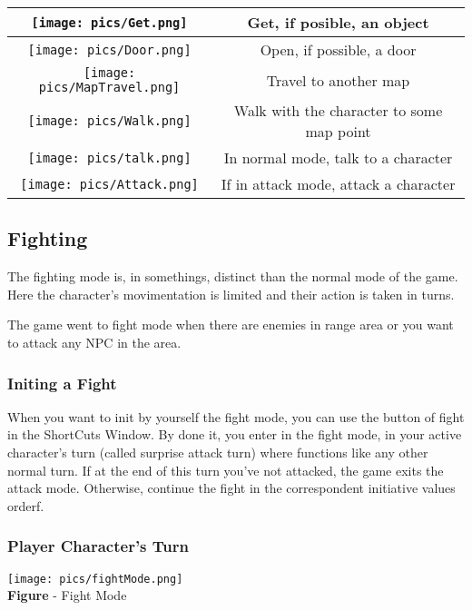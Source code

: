 \documentclass[ letterpaper,12pt]{article}
\begin{document}
\begin{tabular}{|c|c|}
\hline
 \texttt{[image: pics/Get.png]} & Get, if posible, an object\\
\hline
 \texttt{[image: pics/Door.png]} & Open, if possible, a door\\
\hline
 \texttt{[image: pics/MapTravel.png]} & Travel to another map\\
\hline
 \texttt{[image: pics/Walk.png]} & Walk with the character to some map point\\
\hline
 \texttt{[image: pics/talk.png]} & In normal mode, talk to a character\\
\hline
 \texttt{[image: pics/Attack.png]} & If in attack mode, attack a character\\
\hline
\end{tabular}

\subsection{Fighting}

The fighting mode is, in somethings, distinct than the normal mode of the game.
Here the character's movimentation is limited and their action is taken in
turns.

The game went to fight mode when there are enemies in range area or you want to attack any NPC in the area.

\subsubsection{Initing a Fight}

When you want to init by yourself the fight mode, you can use the button of fight in the ShortCuts Window. By done it, you enter in the fight mode, in your active character's turn (called surprise attack turn) where functions like any other normal turn. If at the end of this turn you've not attacked, the game exits the attack mode. Otherwise, continue the fight in the  correspondent initiative values orderf.

\subsubsection{Player Character's Turn}

\begin{center}
  \texttt{[image: pics/fightMode.png]}
\\{\bf Figure} - Fight Mode
\end{center}
\end{document}
